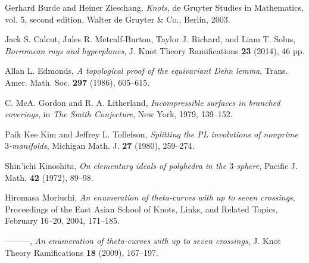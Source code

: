 \documentclass{amsart}
\numberwithin{equation}{section}
\theoremstyle{definition}
\begin{document}
\begin{thebibliography}{99}


	Gerhard Burde and Heiner Zieschang,
	\emph{Knots},
	de Gruyter Studies in Mathematics, vol. 5, second edition, Walter de Gruyter \& Co., Berlin,
	2003.

	Jack S. Calcut, Jules R. Metcalf-Burton, Taylor J. Richard, and Liam T. Solus,
	\emph{Borromean rays and hyperplanes},
	J. Knot Theory Ramifications \textbf{23} (2014), 46 pp.

	Allan L. Edmonds,
	\emph{A topological proof of the equivariant Dehn lemma},
	Trans. Amer. Math. Soc. \textbf{297} (1986), 605--615.


	C. McA. Gordon and R. A. Litherland,
	\emph{Incompressible surfaces in branched coverings},
	in \emph{The Smith Conjecture},
	New York, 1979, 139--152.

	Paik Kee Kim and Jeffrey L. Tollefson,
	\emph{Splitting the PL involutions of nonprime $3$-manifolds},
	Michigan Math. J. \textbf{27} (1980), 259--274.

   Shin'ichi Kinoshita,
   \emph{On elementary ideals of polyhedra in the $3$-sphere},
   Pacific J. Math. \textbf{42} (1972), 89--98.




	Hiromasa Moriuchi,
	\emph{An enumeration of theta-curves with up to seven crossings},
	Proceedings of the East Asian School of Knots, Links, and Related Topics, February 16--20, 2004, 171--185.

	---------,
	\emph{An enumeration of theta-curves with up to seven crossings},
	J. Knot Theory Ramifications \textbf{18} (2009), 167--197.
	

\end{thebibliography}
\end{document}

